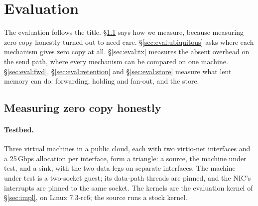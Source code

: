 %
%
\section{Evaluation}
\label{sec:eval}

The evaluation follows the title. \S\ref{sec:eval:method} says how we measure, because measuring
zero copy honestly turned out to need care. \S\ref{sec:eval:ubiquitous} asks where each
mechanism gives zero copy at all. \S\ref{sec:eval:tx} measures the absent overhead on the send
path, where every mechanism can be compared on one machine. \S\ref{sec:eval:fwd},
\S\ref{sec:eval:retention} and \S\ref{sec:eval:store} measure what lent memory can do:
forwarding, holding and fan-out, and the store.

\subsection{Measuring zero copy honestly}
\label{sec:eval:method}

\paragraph{Testbed.} Three virtual machines in a public cloud, each with two virtio-net
interfaces and a 25\,Gbps allocation per interface, form a triangle: a source, the machine
under test, and a sink, with the two data legs on separate interfaces. The machine under test
is a two-socket guest; its data-path threads are pinned, and the NIC's interrupts are pinned
to the same socket. The kernels are the evaluation kernel of \S\ref{sec:impl}, on Linux
7.3-rc6; the source runs a stock kernel. 

